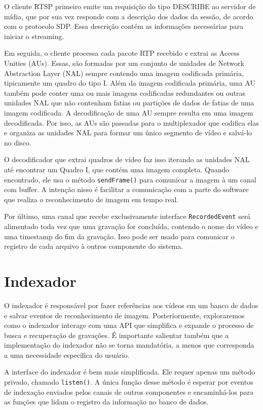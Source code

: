 \documentclass[12pt, %
openright, 
oneside, %
a4paper,    %
brazil]{facom-ufu-abntex2}
\begin{document}
O cliente RTSP primeiro emite um requisição do tipo DESCRIBE ao servidor de
mídia, que por sua vez responde com a descrição dos dados da sessão, de acordo
com o protocolo SDP. Essa descrição contém as informações necessárias para
iniciar o streaming.

Em seguida, o cliente processa cada pacote RTP recebido e extrai as Access
Unities (AUs). Essas, são formadas por um conjunto de unidades de Network
Abstraction Layer (NAL) sempre contendo uma imagem codificada primária,
tipicamente um quadro do tipo I. Além da imagem codificada primária, uma AU
também pode conter uma ou mais imagens codificadas redundantes ou outras
unidades NAL que não contenham fatias ou partições de dados de fatias de uma
imagem codificada. A decodificação de uma AU sempre resulta em uma imagem
decodificada. Por isso, as AUs são passadas para o multiplexador que codifica
elas e organiza as unidades NAL para formar um único segmento de vídeo e
salvá-lo no disco.

O decodificador que extrai quadros de vídeo faz isso iterando as unidades NAL
até encontrar um Quadro I, que contém uma imagem completa. Quando encontrado,
ele usa o método \texttt{sendFrame()} para comunicar a imagem à um
canal com buffer. A intenção nisso é facilitar a comunicação com a parte do
software que realiza o reconhecimento de imagem em tempo real.

Por último, uma canal que recebe exclusivamente interface
\texttt{RecordedEvent} será alimentado toda vez que uma gravação for
concluída, contendo o nome do vídeo e uma timestamp do fim da gravação. Isso
pode ser usado para comunicar o registro de cada arquivo à outros componente do
sistema.

\section{Indexador}

O indexador é responsável por fazer referências aos vídeos em um banco de dados
e salvar eventos de reconhecimento de imagem. Posteriormente, exploraremos como
o indexador interage com uma API que simplifica e expande o processo de busca e
recuperação de gravações. É importante salientar também que a implementação do
indexador não se torna mandatória, a menos que corresponda a uma necessidade
específica do usuário.

A interface do indexador é bem mais simplificada. Ele requer apenas um método
privado, chamado \texttt{listen()}. A única função desse método é
esperar por eventos de indexação enviados pelos canais de outros componentes e
encaminhá-los para as funções que lidam o registro da informação no banco de
dados.
\end{document}
